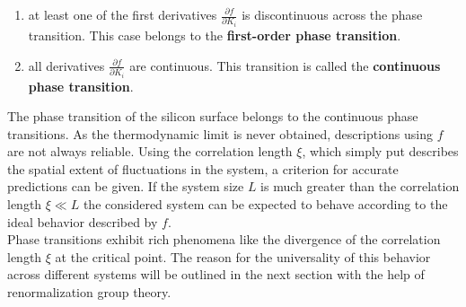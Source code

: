 	\begin{enumerate}
		\item at least one of the first derivatives $\frac{\partial f}{\partial K_i}$ is discontinuous across the phase transition. This case belongs to the \textbf{first-order phase transition}.
		\item all derivatives $\frac{\partial f}{\partial K_i}$ are continuous. This transition is called the \textbf{continuous phase transition}.
	\end{enumerate}
	The phase transition of the silicon surface belongs to the continuous phase transitions. As the thermodynamic limit is never obtained, descriptions using $f$ are not always reliable. Using the correlation length $\xi$, which simply put describes the spatial extent of fluctuations in the system, a criterion for accurate predictions can be given. If the system size $L$ is much greater than the correlation length $\xi \ll L$ the considered system can be expected to behave according to the ideal behavior described by $f$. \\
	
	Phase transitions exhibit rich phenomena like the divergence of the correlation length $\xi$ at the critical point. The reason for the universality of this behavior across different systems will be outlined in the next section with the help of renormalization group theory.
